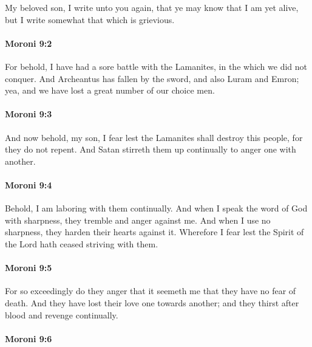 			My beloved son, I write unto you again,
			that ye may know that I am yet alive,
			but I write somewhat that which is grievious.

		\paragraph{Moroni 9:2} %
			\label{MORONI-9-2}

			For behold, I have had a sore battle with the Lamanites,
			in the which we did not conquer.
			And Archeantus has fallen by the sword,
			and also Luram and Emron;
			yea, and we have lost a great number of our choice men.

		\paragraph{Moroni 9:3} %
			\label{MORONI-9-3}

			And now behold, my son,
			I fear lest the Lamanites shall destroy this people,
			for they do not repent.
			And Satan stirreth them up continually to anger one with another.

		\paragraph{Moroni 9:4} %
			\label{MORONI-9-4}

			Behold, I am laboring with them continually.
			And when I speak the word of God with sharpness,
			they tremble and anger against me.
			And when I use no sharpness,
			they harden their hearts against it.
			Wherefore I fear lest the Spirit of the Lord hath ceased striving with them.

		\paragraph{Moroni 9:5} %
			\label{MORONI-9-5}

			For so exceedingly do they anger
			that it seemeth me that they have no fear of death.
			And they have lost their love one towards another;
			and they thirst after blood and revenge continually.

		\paragraph{Moroni 9:6} %
			\label{MORONI-9-6}
			
